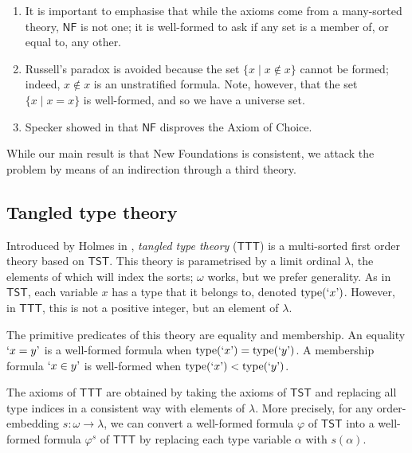 \begin{remarks}\mbox{\negthinspace}
	\begin{enumerate}
		\item It is important to emphasise that while the axioms come from a many-sorted theory, \( \mathsf{NF} \) is not one; it is well-formed to ask if any set is a member of, or equal to, any other.
		\item Russell's paradox is avoided because the set \( \{ x \mid x \notin x \} \) cannot be formed; indeed, \( x \notin x \) is an unstratified formula.
		Note, however, that the set \( \{ x \mid x = x \} \) is well-formed, and so we have a universe set.
		\item Specker showed in \cite{specker-choice-nf} that \( \mathsf{NF} \) disproves the Axiom of Choice.
	\end{enumerate}
\end{remarks}

While our main result is that New Foundations is consistent, we attack the problem by means of an indirection through a third theory.

\subsection{Tangled type theory}
\label{ss:theories:ttt}

Introduced by Holmes in \cite{holmes-ttt}, \emph{tangled type theory} (\( \mathsf{TTT} \)) is a multi-sorted first order theory based on \( \mathsf{TST} \).
This theory is parametrised by a limit ordinal \( \lambda \), the elements of which will index the sorts; \( \omega \) works, but we prefer generality.
As in \( \mathsf{TST} \), each variable \( x \) has a type that it belongs to, denoted \( \operatorname{type}(\text{`}x\text{'}) \).
However, in \( \mathsf{TTT} \), this is not a positive integer, but an element of \( \lambda \).

The primitive predicates of this theory are equality and membership.
An equality \( \text{`}x = y\text{'} \) is a well-formed formula when \( \operatorname{type}(\text{`}x\text{'}) = \operatorname{type}(\text{`}y\text{'}) \).
A membership formula \( \text{`}x \in y\text{'} \) is well-formed when \( \operatorname{type}(\text{`}x\text{'}) < \operatorname{type}(\text{`}y\text{'}) \).

The axioms of \( \mathsf{TTT} \) are obtained by taking the axioms of \( \mathsf{TST} \) and replacing all type indices in a consistent way with elements of \( \lambda \).
More precisely, for any order-embedding \( s : \omega \to \lambda \), we can convert a well-formed formula \( \varphi \) of \( \mathsf{TST} \) into a well-formed formula \( \varphi^s \) of \( \mathsf{TTT} \) by replacing each type variable \( \alpha \) with \( s(\alpha) \).

